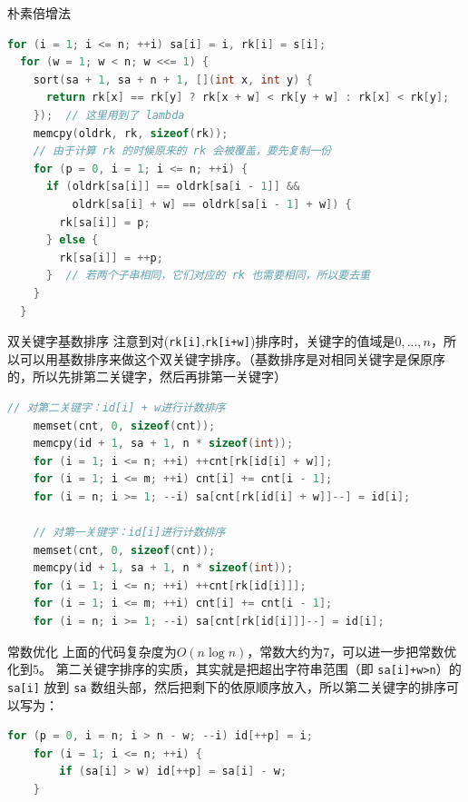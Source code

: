 \documentclass{beamer}
\begin{document}
\begin{frame}[fragile]{朴素倍增法}
    \small
    \begin{lstlisting}[language=c++]
  for (i = 1; i <= n; ++i) sa[i] = i, rk[i] = s[i];
  for (w = 1; w < n; w <<= 1) {
    sort(sa + 1, sa + n + 1, [](int x, int y) {
      return rk[x] == rk[y] ? rk[x + w] < rk[y + w] : rk[x] < rk[y];
    });  // 这里用到了 lambda
    memcpy(oldrk, rk, sizeof(rk));
    // 由于计算 rk 的时候原来的 rk 会被覆盖，要先复制一份
    for (p = 0, i = 1; i <= n; ++i) {
      if (oldrk[sa[i]] == oldrk[sa[i - 1]] &&
          oldrk[sa[i] + w] == oldrk[sa[i - 1] + w]) {
        rk[sa[i]] = p;
      } else {
        rk[sa[i]] = ++p;
      }  // 若两个子串相同，它们对应的 rk 也需要相同，所以要去重
    }
  }
    \end{lstlisting}
\end{frame}

\begin{frame}[fragile]{双关键字基数排序}
    \small
    注意到对(\verb|rk[i]|,\verb|rk[i+w]|)排序时，关键字的值域是$0,...,n$，所以可以用基数排序来做这个双关键字排序。（基数排序是对相同关键字是保原序的，所以先排第二关键字，然后再排第一关键字）
    \begin{lstlisting}[language=c++]
    // 对第二关键字：id[i] + w进行计数排序
    memset(cnt, 0, sizeof(cnt));
    memcpy(id + 1, sa + 1, n * sizeof(int));
    for (i = 1; i <= n; ++i) ++cnt[rk[id[i] + w]];
    for (i = 1; i <= m; ++i) cnt[i] += cnt[i - 1];
    for (i = n; i >= 1; --i) sa[cnt[rk[id[i] + w]]--] = id[i];

    // 对第一关键字：id[i]进行计数排序
    memset(cnt, 0, sizeof(cnt));
    memcpy(id + 1, sa + 1, n * sizeof(int));
    for (i = 1; i <= n; ++i) ++cnt[rk[id[i]]];
    for (i = 1; i <= m; ++i) cnt[i] += cnt[i - 1];
    for (i = n; i >= 1; --i) sa[cnt[rk[id[i]]]--] = id[i];
    \end{lstlisting}
\end{frame}

\begin{frame}[fragile]{常数优化}
    上面的代码复杂度为$O(n\log n)$，常数大约为$7$，可以进一步把常数优化到$5$。
    \vspace{1em}
    第二关键字排序的实质，其实就是把超出字符串范围（即 \verb|sa[i]+w>n|）的 \verb|sa[i]| 放到 \verb|sa| 数组头部，然后把剩下的依原顺序放入，所以第二关键字的排序可以写为：
    \begin{lstlisting}[language=c++]
    for (p = 0, i = n; i > n - w; --i) id[++p] = i;
    for (i = 1; i <= n; ++i) {
        if (sa[i] > w) id[++p] = sa[i] - w;
    }
    \end{lstlisting}
\end{frame}
\end{document}
